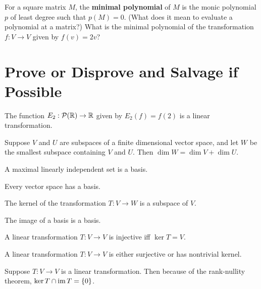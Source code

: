 \documentclass{homework}
\begin{document}
\begin{problem}
  For a square matrix $M$, the \textbf{minimal polynomial} of $M$ is
  the monic polynomial $p$ of least degree such that $p(M) = 0$.
  (What does it mean to evaluate a polynomial at a matrix?)  What is
  the minimal polynomial of the transformation $f : V \to V$ given by
  $f(v) = 2v$?
\end{problem}

\section{Prove or Disprove and Salvage if Possible}

\begin{problem}
  The function $E_2 : \mathcal{P}(\mathbb{R}) \to \mathbb{R}$ given by $E_2(f) = f(2)$ is a linear transformation.
\end{problem}

\begin{problem}
  Suppose $V$ and $U$ are subspaces of a finite dimensional vector
  space, and let $W$ be the smallest subspace containing $V$ and $U$.
  Then $\dim W = \dim V + \dim U$.
\end{problem}

\begin{problem}
  A maximal linearly independent set is a basis.
\end{problem}

\begin{problem}
  Every vector space has a basis.
\end{problem}

\begin{problem}
  The kernel of the transformation $T : V \to W$ is a subspace of $V$.
\end{problem}

\begin{problem}
  The image of a basis is a basis.
\end{problem}

\begin{problem} %
  A linear transformation $T : V \to V$ is injective iff $\ker T = V$.
\end{problem}

\begin{problem}
  A linear transformation $T : V \to V$ is either surjective or has nontrivial kernel.
\end{problem}

\begin{problem}
  Suppose $T : V \to V$ is a linear transformation.  Then because of the rank-nullity theorem, $\ker T \cap \operatorname{im} T = \{0\}$.
\end{problem}
\end{document}
